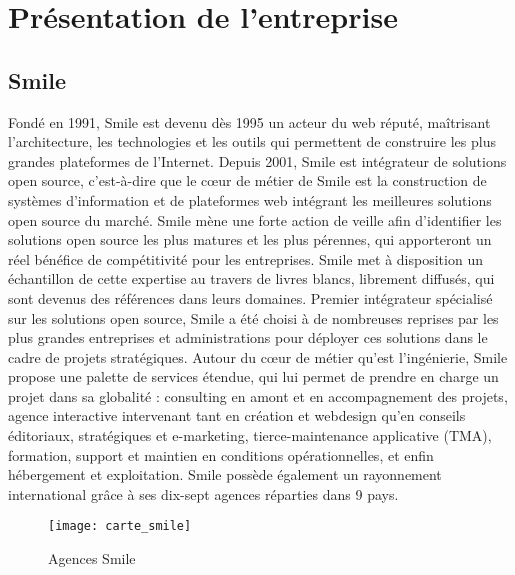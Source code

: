 
\section{Présentation de l'entreprise}

\subsection{Smile}

Fondé en 1991, Smile est devenu dès 1995 un acteur du web réputé, maîtrisant l’architecture,
les technologies et les outils qui permettent de construire les plus grandes plateformes de
l’Internet.
Depuis 2001, Smile est intégrateur de solutions open source, c'est-à-dire que le cœur de
métier de Smile est la construction de systèmes d’information et de plateformes web
intégrant les meilleures solutions open source du marché.
Smile mène une forte action de veille afin d’identifier les solutions open source les plus
matures et les plus pérennes, qui apporteront un réel bénéfice de compétitivité pour les
entreprises. Smile met à disposition un échantillon de cette expertise au travers de livres
blancs, librement diffusés, qui sont devenus des références dans leurs domaines.
Premier intégrateur spécialisé sur les solutions open source, Smile a été choisi à de
nombreuses reprises par les plus grandes entreprises et administrations pour déployer ces
solutions dans le cadre de projets stratégiques.
Autour du cœur de métier qu’est l’ingénierie, Smile propose une palette de services étendue,
qui lui permet de prendre en charge un projet dans sa globalité : consulting en amont et en
accompagnement des projets, agence interactive intervenant tant en création et
webdesign qu’en conseils éditoriaux, stratégiques et e-marketing, tierce-maintenance
applicative (TMA), formation, support et maintien en conditions opérationnelles, et enfin
hébergement et exploitation.
Smile possède également un rayonnement international grâce à ses dix-sept agences
réparties dans 9 pays.

\begin{figure}[!h]
  \texttt{[image: carte\_smile]}
  \caption{\label{smile_map} Agences Smile}
\end{figure}

